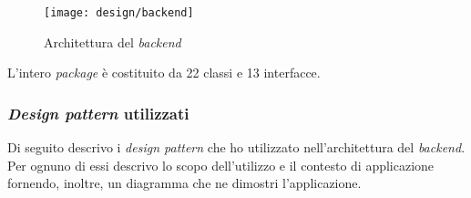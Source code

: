 \begin{figure}[!ht]
  \begin{center}
    \texttt{[image: design/backend]}
    \caption{Architettura del \emph{\gls{backend}}}
    \label{fig:be-design}
  \end{center}
\end{figure}

L'intero \emph{package} è costituito da 22 classi e 13 interfacce.

\subsubsection{\emph{Design pattern} utilizzati}
Di seguito descrivo i \emph{design pattern} che ho utilizzato nell'architettura del \emph{\gls{backend}}. 
Per ognuno di essi descrivo lo scopo dell'utilizzo e il contesto di applicazione fornendo, inoltre, un diagramma che ne dimostri l'applicazione.
